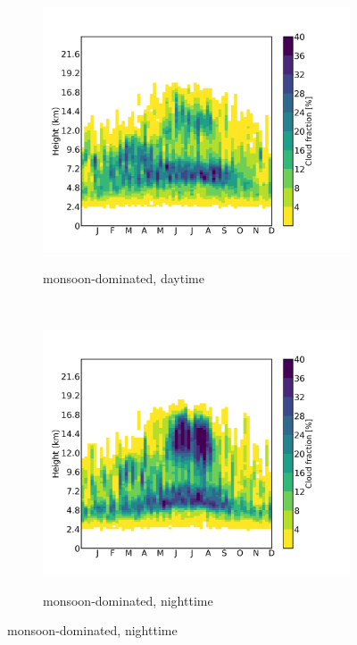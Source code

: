\documentclass[alpha-refs]{wiley-article}
\begin{document}
\begin{figure}[!htbp]
\begin{subfigure}[b]{0.5\textwidth}
    \end{subfigure}
    
    \bigskip

    \begin{subfigure}[b]{0.5\textwidth}
        \centering
        \caption{monsoon-dominated, daytime }        
        \includegraphics[width=\textwidth]{cloudsat_cloudfract_seasonal_monsoonmode_day.png}
        \label{fig:vertical_cloudfract3}

    \end{subfigure}%
    ~ 
    \begin{subfigure}[b]{0.5\textwidth}
        \centering
        \caption{monsoon-dominated, nighttime }        
        \includegraphics[width=\textwidth]{cloudsat_cloudfract_seasonal_monsoonmode_night.png}
        \label{fig:vertical_cloudfract4}


\end{subfigure}
\end{figure}
\end{document}
